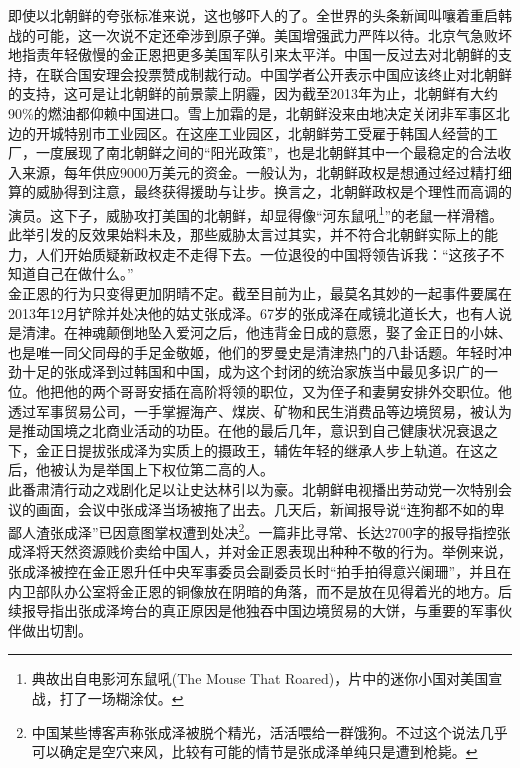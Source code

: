 即使以北朝鲜的夸张标准来说，这也够吓人的了。全世界的头条新闻叫嚷着重启韩战的可能，这一次说不定还牵涉到原子弹。美国增强武力严阵以待。北京气急败坏地指责年轻傲慢的金正恩把更多美国军队引来太平洋。中国一反过去对北朝鲜的支持，在联合国安理会投票赞成制裁行动。中国学者公开表示中国应该终止对北朝鲜的支持，这可是让北朝鲜的前景蒙上阴霾，因为截至2013年为止，北朝鲜有大约90\%的燃油都仰赖中国进口。雪上加霜的是，北朝鲜没来由地决定关闭非军事区北边的开城特别市工业园区。在这座工业园区，北朝鲜劳工受雇于韩国人经营的工厂，一度展现了南北朝鲜之间的“阳光政策”，也是北朝鲜其中一个最稳定的合法收入来源，每年供应9000万美元的资金。一般认为，北朝鲜政权是想通过经过精打细算的威胁得到注意，最终获得援助与让步。换言之，北朝鲜政权是个理性而高调的演员。这下子，威胁攻打美国的北朝鲜，却显得像“河东鼠吼\footnote{典故出自电影河东鼠吼(The Mouse That Roared)，片中的迷你小国对美国宣战，打了一场糊涂仗。}”的老鼠一样滑稽。\\

此举引发的反效果始料未及，那些威胁太言过其实，并不符合北朝鲜实际上的能力，人们开始质疑新政权走不走得下去。一位退役的中国将领告诉我：“这孩子不知道自己在做什么。”\\

金正恩的行为只变得更加阴晴不定。截至目前为止，最莫名其妙的一起事件要属在2013年12月铲除并处决他的姑丈张成泽。67岁的张成泽在咸镜北道长大，也有人说是清津。在神魂颠倒地坠入爱河之后，他违背金日成的意愿，娶了金正日的小妹、也是唯一同父同母的手足金敬姬，他们的罗曼史是清津热门的八卦话题。年轻时冲劲十足的张成泽到过韩国和中国，成为这个封闭的统治家族当中最见多识广的一位。他把他的两个哥哥安插在高阶将领的职位，又为侄子和妻舅安排外交职位。他透过军事贸易公司，一手掌握海产、煤炭、矿物和民生消费品等边境贸易，被认为是推动国境之北商业活动的功臣。在他的最后几年，意识到自己健康状况衰退之下，金正日提拔张成泽为实质上的摄政王，辅佐年轻的继承人步上轨道。在这之后，他被认为是举国上下权位第二高的人。\\

此番肃清行动之戏剧化足以让史达林引以为豪。北朝鲜电视播出劳动党一次特别会议的画面，会议中张成泽当场被拖了出去。几天后，新闻报导说“连狗都不如的卑鄙人渣张成泽”已因意图掌权遭到处决\footnote{中国某些博客声称张成泽被脱个精光，活活喂给一群饿狗。不过这个说法几乎可以确定是空穴来风，比较有可能的情节是张成泽单纯只是遭到枪毙。}。一篇非比寻常、长达2700字的报导指控张成泽将天然资源贱价卖给中国人，并对金正恩表现出种种不敬的行为。举例来说，张成泽被控在金正恩升任中央军事委员会副委员长时“拍手拍得意兴阑珊”，并且在内卫部队办公室将金正恩的铜像放在阴暗的角落，而不是放在见得着光的地方。后续报导指出张成泽垮台的真正原因是他独吞中国边境贸易的大饼，与重要的军事伙伴做出切割。\\

